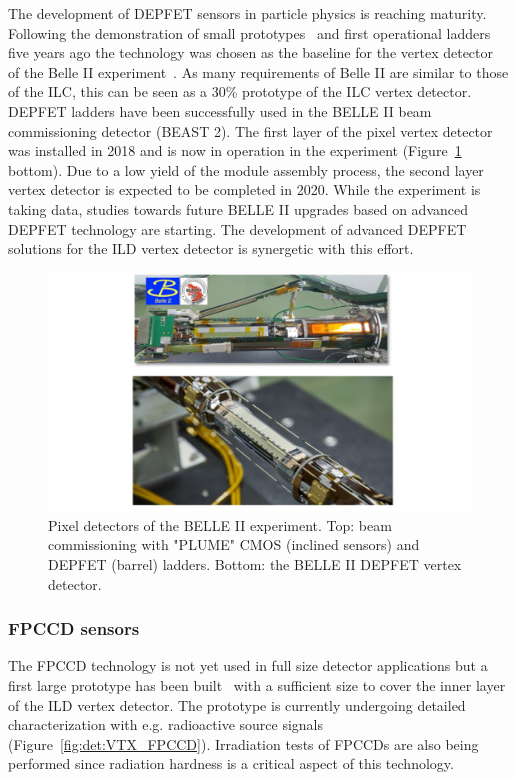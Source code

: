 The development of DEPFET sensors in particle physics is reaching maturity. Following the demonstration of small
prototypes~\cite{Andricek:2011zza,Velthuis:2008zza} and first operational ladders five years ago the technology was 
chosen as the baseline for the vertex detector~\cite{Marinas:2011zz} of the Belle II experiment~\cite{Abe:2010gxa}. 
As many requirements of Belle II are similar to those
of the ILC, this can be seen as a 30\% prototype of the ILC vertex detector. DEPFET ladders have been successfully used 
in the BELLE II beam commissioning detector (BEAST 2). The first layer of the pixel vertex detector was installed in 2018
and is now in operation in the experiment (Figure~\ref{fig:det:VTX_BELLE2} bottom). Due to a low yield of the module assembly 
process, the second layer vertex detector is expected to be completed in 2020. While the experiment is 
taking data, studies towards future BELLE II upgrades based on advanced DEPFET technology are starting. The development of advanced DEPFET solutions for the ILD vertex detector is synergetic with this effort.

\begin{figure}[t!]
\centering
\includegraphics[width=1.0\hsize]{Detector/fig/VTX_BELLE2.jpg}
\caption{Pixel detectors of the BELLE II experiment. Top: beam commissioning with "PLUME" CMOS (inclined sensors) and DEPFET (barrel) ladders. Bottom: the BELLE II DEPFET vertex detector.}
\label{fig:det:VTX_BELLE2}
\end{figure}

\subsubsection{FPCCD sensors}

The FPCCD technology is not yet used in full size detector applications but a first large prototype has been built~\cite{ild:bib:FPCCD} with a sufficient size to cover the inner layer of the ILD vertex detector. The prototype is currently undergoing detailed characterization with e.g. radioactive source signals (Figure~\ref{fig:det:VTX_FPCCD}). Irradiation tests of FPCCDs are also being performed since radiation hardness is a critical aspect of this technology.   

